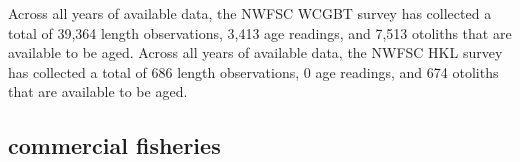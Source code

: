 \documentclass[11pt,
  english,
  letterpaper,
]{article}
\begin{document}
\leavevmode\tagmcend\tagstructend\par


Across all years of available data, the NWFSC WCGBT survey has collected a total of 39,364 length observations, 3,413 age readings, and 7,513 otoliths that are available to be aged. Across all years of available data, the NWFSC HKL survey has collected a total of 686 length observations, 0 age readings, and 674 otoliths that are available to be aged.

\leavevmode\tagmcend\tagstructend\par


\hypertarget{commercial-fisheries-25}{%
\subsection{commercial fisheries}\label{commercial-fisheries-25}}

\leavevmode\tagmcend\tagstructend


\begingroup\fontsize{10}{12}\selectfont \begingroup\fontsize{10}{12}\selectfont

\leavevmode\tagmcend\tagstructend\par
\end{document}
